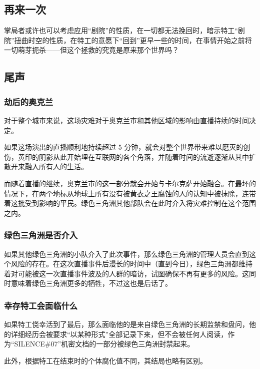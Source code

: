 \subsection{再来一次}

掌局者或许也可以考虑应用“剧院”的性质，在一切都无法挽回时，暗示特工“剧院”扭曲时空的性质，在特工的意愿下“回到”更早一些的时间，在事情开始之前将一切萌芽扼杀——但这个拯救的究竟是原来那个世界吗？

\subsection{尾声}

\subsubsection{劫后的奥克兰}

对于整个城市来说，这场灾难对于奥克兰市和其他区域的影响由直播持续的时间决定。

如果这场演出的直播顺利地持续超过 5 分钟，就会对整个世界带来难以磨灭的创伤，黄印的阴影从此开始埋在互联网的各个角落，并随着时间的流逝逐渐从其中扩散开来融入所有人的生活。

而随着直播的继续，奥克兰市的这一部分就会开始与卡尔克萨开始融合。在最坏的情况下，在两个地标从地球上所有没有被黄衣之王腐蚀的人的认知中被抹除，连带着这批受到影响的平民。绿色三角洲其他部队会在此时介入将灾难控制在这个范围之内。

\subsubsection{绿色三角洲是否介入}

如果其他绿色三角洲的小队介入了此次事件，那么绿色三角洲的管理人员会直到这个风险的存在。在这次直播事件后漫长的时间中（直到今日），绿色三角洲都维持着对可能被这一次直播事件波及的人群的暗访，试图确保不再有更多的风险。这同时意味着绿色三角洲更多的牺牲，不过这也是后话了。


\subsubsection{幸存特工会面临什么}

如果特工侥幸活到了最后，那么面临他的是来自绿色三角洲的长期监禁和盘问，他的详细经历会被要求“以某种形式”全部记录下来，但不会被任何人阅读，作为“SILENCE\#07”机密文档的一部分被绿色三角洲封禁起来。

此外，根据特工在结束时的个体腐化值不同，其结局也略有区别。

